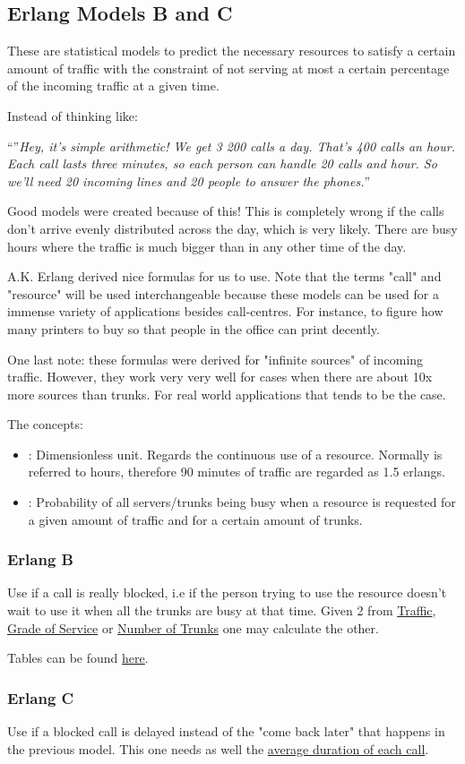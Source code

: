 \subsection{Erlang Models B and C}
\par These are statistical models to predict the necessary resources to satisfy a certain amount of traffic with the constraint of not serving at most a certain percentage of the incoming traffic at a given time. 
\par Instead of thinking like:
\begin{center}
    ``''\textit{Hey, it's simple arithmetic! We get 3 200 calls a day. That's 400 calls an hour. Each call lasts three minutes, so each person can handle 20 calls and hour. So we'll need 20 incoming  lines and 20 people to answer the phones.}''
\end{center}
Good models were created because of this! This is completely wrong if the calls don't arrive evenly distributed across the day, which is very likely. There are busy hours where the traffic is much bigger than in any other time of the day. 
\par A.K. Erlang derived nice formulas for us to use. Note that the terms "call" and "resource" will be used interchangeable because these models can be used for a immense variety of applications besides call-centres. For instance, to figure how many printers to buy so that people in the office can print decently.
\par One last note: these formulas were derived for "infinite sources" of incoming traffic. However, they work very very well for cases when there are about 10x more sources than trunks. For real world applications that tends to be the case. 

\par The concepts:
\begin{itemize}
    \item {}: Dimensionless unit. Regards the continuous use of a resource. Normally is referred to hours, therefore 90 minutes of traffic are regarded as 1.5 erlangs.
    \item {}: Probability of all servers/trunks being busy when a resource is requested for a given amount of traffic and for a certain amount of trunks.
\end{itemize}


\subsubsection*{Erlang B}
Use if a call is really blocked, i.e if the person trying to use the resource doesn't wait to use it when all the trunks are busy at that time. Given 2 from \ul{Traffic}, \ul{Grade of Service} or \ul{Number of Trunks} one may calculate the other.
\par Tables can be found \href{https://onlinelibrary.wiley.com/doi/pdf/10.1002/0470862696.app5}{here}.

\subsubsection*{Erlang C}
Use if a blocked call is delayed instead of the "come back later" that happens in the previous model. This one needs as well the \ul{average duration of each call}.



